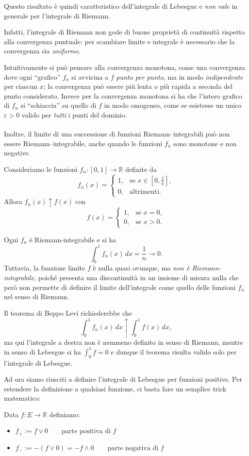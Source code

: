 Questo risultato è quindi caratteristico dell'integrale di Lebesgue e \emph{non vale} in generale per l'integrale di Riemann. 

\medskip
\noindent Infatti, l'integrale di Riemann non gode di buone proprietà di continuità rispetto alla convergenza puntuale: per scambiare limite e integrale è necessario che la convergenza sia \emph{uniforme}. 

\medskip
\noindent Intuitivamente si può pensare alla convergenza monotona, come una convergenza dove ogni ``grafico'' $f_n$ si avvicina a $f$ \textit{punto per punto}, ma in modo \emph{indipendente} per ciascun $x$; la convergenza può essere più lenta o più rapida a seconda del punto considerato. Invece per la convergenza monotona si ha che l'intero grafico di $f_n$ si ``schiaccia'' su quello di $f$ in modo omogeneo, come se esistesse un unico $\varepsilon>0$ valido per \emph{tutti} i punti del dominio.\\
\\
Inoltre, il limite di una successione di funzioni Riemann--integrabili può non essere Riemann--integrabile, anche quando le funzioni $f_n$ sono monotone e non negative.

\begin{esempio}
Consideriamo le funzioni $f_n : [0,1] \to \mathbb{R}$ definite da
\[
f_n(x) = 
\begin{cases}
1, & \text{se } x \in \left[0, \tfrac{1}{n}\right],\\[4pt]
0, & \text{altrimenti.}
\end{cases}
\]
Allora $f_n(x) \uparrow f(x)$ con
\[
f(x) = 
\begin{cases}
1, & \text{se } x = 0,\\[4pt]
0, & \text{se } x > 0.
\end{cases}
\]

Ogni $f_n$ è Riemann-integrabile e si ha
\[
\int_0^1 f_n(x)\,dx = \frac{1}{n} \to 0.
\]
Tuttavia, la funzione limite $f$ è nulla quasi ovunque, ma \emph{non è Riemann-integrabile}, poiché presenta una discontinuità in un insieme di misura nulla che però non permette di definire il limite dell’integrale come quello delle funzioni $f_n$ nel senso di Riemann.

Il teorema di Beppo Levi richiederebbe che
\[
\int_0^1 f_n(x)\,dx \uparrow \int_0^1 f(x)\,dx,
\]
ma qui l’integrale a destra non è nemmeno definito in senso di Riemann, mentre in senso di Lebesgue si ha $\int_0^1 f = 0$ e dunque il teorema risulta valido solo per l’integrale di Lebesgue.
\end{esempio}
\bigskip
\noindent Ad ora siamo riusciti a definire l'integrale di Lebesgue per funzioni positive. Per estendere la definizione a qualsiasi funzione, ci basta fare un semplice trick matematico:
\begin{definizione}
    Data $f:E\to\mathbb{R}$ definiamo:
    \begin{itemize}
        \item $f_+:=f \vee 0 \qquad \text{parte positiva di }f $
        \item $f_-:=-(f \vee 0) = -f\wedge 0 \qquad \text{parte negativa di }f $
    \end{itemize}
\end{definizione}

